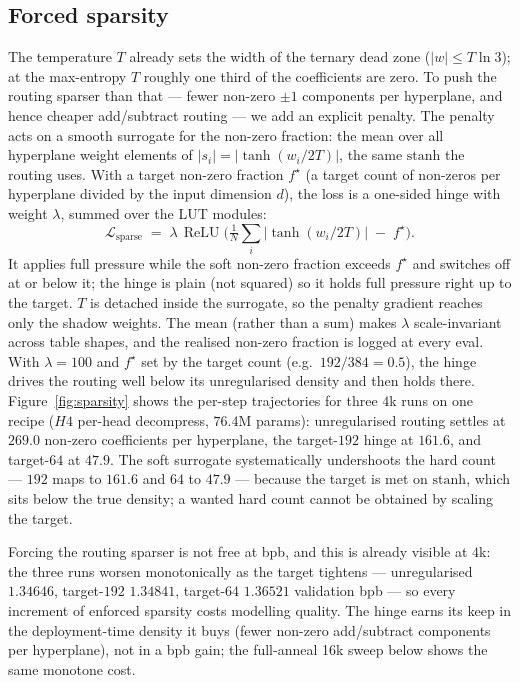 \documentclass[11pt]{article}
\begin{document}
\subsection{Forced sparsity}
\label{sec:sparsity}
The temperature $T$ already sets the width of the ternary dead
zone ($|w|\le T\ln 3$); at the max-entropy $T$ roughly one third of the coefficients are zero.
To push the routing sparser than that --- fewer non-zero $\pm1$ components per hyperplane, and
hence cheaper add/subtract routing --- we add an explicit penalty. The penalty acts on a smooth
surrogate for the non-zero fraction: the mean over all hyperplane weight elements of
$|s_i|=|\tanh(w_i/2T)|$, the same $\mathrm{stanh}$ the routing uses. With a target non-zero
fraction $f^{\star}$ (a target count of non-zeros per hyperplane divided by the input dimension
$d$), the loss is a one-sided hinge with weight $\lambda$, summed over the LUT modules:
\begin{equation}
\mathcal{L}_{\mathrm{sparse}}\;=\;\lambda\,\operatorname{ReLU}\!\Big(\tfrac{1}{N}\textstyle\sum_{i} \big|\tanh(w_i/2T)\big|\;-\;f^{\star}\Big).
\end{equation}
It applies full pressure while the soft non-zero fraction exceeds $f^{\star}$ and switches off at
or below it; the hinge is plain (not squared) so it holds full pressure right up to the target.
$T$ is detached inside the surrogate, so the penalty gradient reaches only the shadow weights.
The mean (rather than a sum) makes $\lambda$ scale-invariant across table shapes, and the
realised non-zero fraction is logged at every eval. With $\lambda=100$ and $f^{\star}$ set by
the target count (e.g.\ $192/384=0.5$), the hinge drives the routing well below its
unregularised density and then holds there. Figure~\ref{fig:sparsity} shows the per-step
trajectories for three
$4$k runs on one recipe ($H4$ per-head decompress, $76.4$M params): unregularised routing
settles at $269.0$ non-zero coefficients per hyperplane, the target-$192$ hinge at $161.6$, and
target-$64$ at $47.9$. The soft surrogate systematically undershoots the hard count --- $192$
maps to $161.6$ and $64$ to $47.9$ --- because the target is met on $\mathrm{stanh}$, which sits
below the true density; a wanted hard count cannot be obtained by scaling the target.

Forcing the routing sparser is not free at bpb, and this is already visible at $4$k: the three
runs worsen monotonically as the target tightens --- unregularised $1.34646$, target-$192$
$1.34841$, target-$64$ $1.36521$ validation bpb --- so every increment of enforced sparsity
costs modelling quality. The hinge earns its keep in the deployment-time density it buys (fewer
non-zero add/subtract components per hyperplane), not in a bpb gain; the full-anneal 16k sweep
below shows the same monotone cost.
\end{document}
